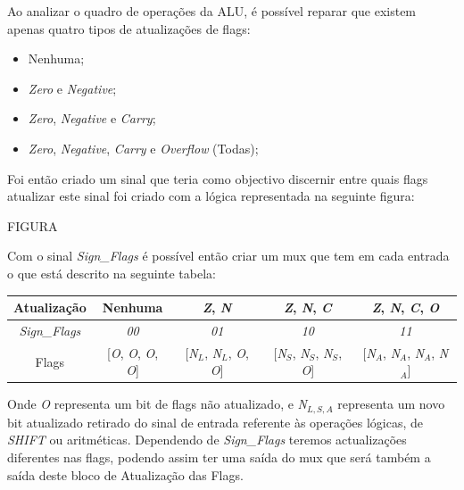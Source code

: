 \documentclass[11pt]{article}
\numberwithin{equation}{section}
\begin{document}
Ao analizar o quadro de operações da ALU, é possível reparar que existem apenas  quatro tipos de atualizações de flags:

\begin{itemize}
	\item Nenhuma;
	\vspace{-3.5mm}
	\item \textit{Zero} e \textit{Negative};
	\vspace{-3.5mm}
	\item \textit{Zero}, \textit{Negative} e \textit{Carry};
	\vspace{-3.5mm}
	\item \textit{Zero}, \textit{Negative}, \textit{Carry} e \textit{Overflow} (Todas);
\end{itemize}

Foi então criado um sinal que teria como objectivo discernir entre quais flags atualizar este sinal foi criado com a lógica representada na seguinte figura:

FIGURA

Com o sinal \textit{Sign\_Flags} é possível então criar um mux que tem em cada entrada o que está descrito na seguinte tabela:

\vspace{+2.5mm}
\begin{tabular}{|c|c|c|c|c|}
	\hline \rule[-2ex]{0pt}{5.5ex} Atualização & Nenhuma & \textit{Z}, \textit{N} & \textit{Z}, \textit{N}, \textit{C} & \textit{Z}, \textit{N}, \textit{C}, \textit{O} \\ 
	\hline \rule[-2ex]{0pt}{5.5ex} \textit{Sign\_Flags} & \textit{00} & \textit{01} & \textit{10} & \textit{11} \\ 
	\hline \rule[-2ex]{0pt}{5.5ex} Flags & [\textit{O}, \textit{O}, \textit{O}, \textit{O}] & [\textit{N{\scriptsize $ _{L} $}}, \textit{N{\scriptsize $ _{L} $}}, \textit{O}, \textit{O}] & [\textit{N{\scriptsize $ _{S} $}}, \textit{N{\scriptsize $ _{S} $}}, \textit{N{\scriptsize $ _{S} $}}, \textit{O}] & [\textit{N{\scriptsize $ _{A} $}}, \textit{N{\scriptsize $ _{A} $}}, \textit{N{\scriptsize $ _{A} $}}, \textit{N{\scriptsize $ _{A} $}}] \\ 
	\hline 
\end{tabular} 
\vspace{+3.5mm}

Onde \textit{O} representa um bit de flags não atualizado, e \textit{N{\scriptsize $ _{L,S,A} $}} representa um novo bit atualizado retirado do sinal de entrada referente às operações lógicas, de \textit{SHIFT} ou aritméticas. Dependendo de \textit{Sign\_Flags} teremos actualizações diferentes nas flags, podendo assim ter uma saída do mux que será também a saída deste bloco de Atualização das Flags.
\end{document}
